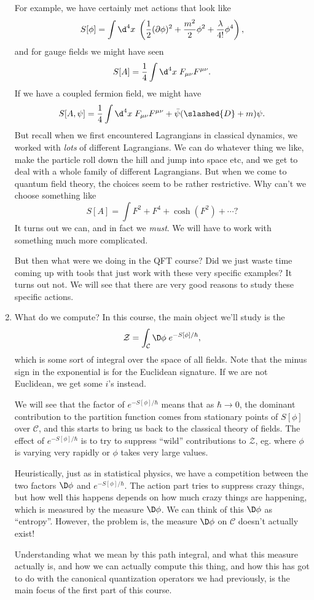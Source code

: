 \documentclass[a4paper]{article}
\begin{document}
\begin{enumerate}
    For example, we have certainly met actions that look like
    \[
      S[\phi] = \int \d^4 x\; \left(\frac{1}{2} (\partial \phi)^2 + \frac{m^2}{2} \phi^2 + \frac{\lambda}{4!} \phi^4\right),
    \]
    and for gauge fields we might have seen
    \[
      S[A] = \frac{1}{4} \int \d^4 x\; F_{\mu\nu}F^{\mu\nu}.
    \]
    If we have a coupled fermion field, we might have
    \[
      S[A, \psi] = \frac{1}{4} \int \d^4 x\; F_{\mu\nu}F^{\mu\nu} + \bar\psi (\slashed{D} + m) \psi.
    \]
    But recall when we first encountered Lagrangians in classical dynamics, we worked with \emph{lots} of different Lagrangians. We can do whatever thing we like, make the particle roll down the hill and jump into space etc, and we get to deal with a whole family of different Lagrangians. But when we come to quantum field theory, the choices seem to be rather restrictive. Why can't we choose something like
    \[
      S[A] = \int F^2 + F^4 + \cosh(F^2) + \cdots?
    \]
    It turns out we can, and in fact we \emph{must}. We will have to work with something much more complicated.

    But then what were we doing in the QFT course? Did we just waste time coming up with tools that just work with these very specific examples? It turns out not. We will see that there are very good reasons to study these specific actions.
  \item What do we compute? In this course, the main object we'll study is the 
    \[
      \mathcal{Z} = \int_\mathcal{C} \D \phi\; e^{-S[\phi]/\hbar},
    \]
    which is some sort of integral over the space of all fields. Note that the minus sign in the exponential is for the Euclidean signature. If we are not Euclidean, we get some $i$'s instead.

    We will see that the factor of $e^{-S[\phi]/\hbar}$ means that as $\hbar \to 0$, the dominant contribution to the partition function comes from stationary points of $S[\phi]$ over $\mathcal{C}$, and this starts to bring us back to the classical theory of fields. The effect of $e^{-S[\phi]/\hbar}$ is to try to suppress ``wild'' contributions to $\mathcal{Z}$, eg. where $\phi$ is varying very rapidly or $\phi$ takes very large values.

     Heuristically, just as in statistical physics, we have a competition between the two factors $\D \phi$ and $e^{-S[\phi]/\hbar}$. The action part tries to suppress crazy things, but how well this happens depends on how much crazy things are happening, which is measured by the measure $\D \phi$. We can think of this $\D \phi$ as ``entropy''. However, the problem is, the measure $\D \phi$ on $\mathcal{C}$ doesn't actually exist!

    Understanding what we mean by this path integral, and what this measure actually is, and how we can actually compute this thing, and how this has got to do with the canonical quantization operators we had previously, is the main focus of the first part of this course.
\end{enumerate}
\end{document}
